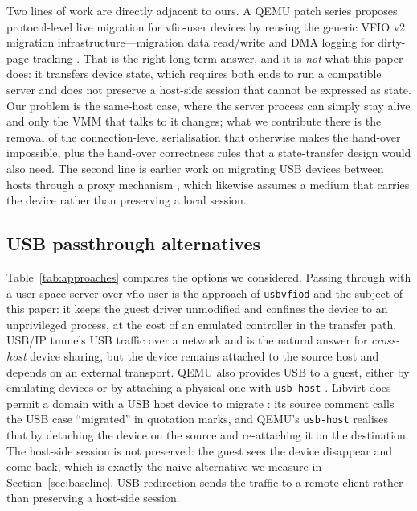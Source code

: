 \documentclass[10pt,conference]{IEEEtran}
\newcommand{\code}[1]{\texttt{#1}}
\begin{document}
Two lines of work are directly adjacent to ours. A QEMU patch series proposes
protocol-level live migration for vfio-user devices by reusing the generic VFIO
v2 migration infrastructure---migration data read/write and DMA logging for
dirty-page tracking \cite{komatsu2026vfiousermig}. That is the right long-term
answer, and it is \emph{not} what this paper does: it transfers device state, which
requires both ends to run a compatible server and does not preserve a host-side session that cannot be expressed as state. Our problem is the same-host case,
where the server process can simply stay alive and only the VMM that talks to
it changes; what we contribute there is the removal of the connection-level
serialisation that otherwise makes the hand-over impossible, plus the
hand-over correctness rules that a state-transfer design would also need. The
second line is earlier work on migrating USB devices between hosts through a
proxy mechanism \cite{watanabe2010usbglobal}, which likewise assumes a
medium that carries the device rather than preserving a local session.

\subsection{USB passthrough alternatives}
Table~\ref{tab:approaches} compares the options we considered. Passing through
with a user-space server over vfio-user is the approach of \code{usbvfiod} and
the subject of this paper: it keeps the guest driver unmodified and confines
the device to an unprivileged process, at the cost of an emulated controller in
the transfer path. USB/IP \cite{hirofuchi2005usbip,kernelusbip} tunnels USB
traffic over a network and is the natural answer for \emph{cross-host} device
sharing, but the device remains attached to the source host and depends on an
external transport. QEMU also provides USB to a guest, either by emulating
devices or by attaching a physical one with \code{usb-host} \cite{qemuusb}.
Libvirt does permit a domain with a USB host device to migrate
\cite{libvirtmigrationsrc}: its source comment calls the USB case ``migrated''
in quotation marks, and QEMU's \code{usb-host} realises that by detaching the
device on the source and re-attaching it on the destination. The host-side
session is not preserved: the guest sees the device
disappear and come back, which is exactly the naive alternative we measure in
Section~\ref{sec:baseline}. USB redirection sends the traffic to a remote client
\cite{usbredir} rather than preserving a host-side session.
\end{document}
